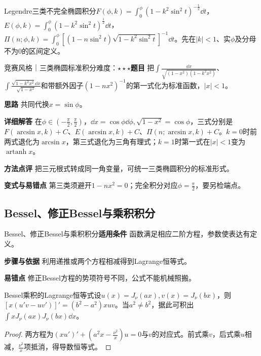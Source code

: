 \begin{definition}{Legendre三类不完全椭圆积分}$F(\phi,k)=\int_0^\phi(1-k^2\sin^2t)^{-\frac{1}{2}}\dd t$，$E(\phi,k)=\int_0^\phi(1-k^2\sin^2t)^{\frac{1}{2}}\dd t$，$\Pi(n;\phi,k)=\int_0^\phi[(1-n\sin^2t)\sqrt{1-k^2\sin^2t}]^{-1}\dd t$。先在$|k|<1$、实$\phi$及分母不为0的区间定义。\end{definition}

\begin{example}{竞赛风格｜三类椭圆标准积分}{难度：$\star\star\star$}\label{deep:ex:integral_special_deep:elliptic3}\textbf{题目} 把$\int\frac{\dd x}{\sqrt{(1-x^2)(1-k^2x^2)}}$、$\int\frac{\sqrt{1-k^2x^2}\dd x}{\sqrt{1-x^2}}$和带额外因子$(1-nx^2)^{-1}$的第一式化为标准函数，$|x|<1$。\par\textbf{思路} 共同代换$x=\sin\phi$。\par\textbf{详细解答} 在$\phi\in(-\frac{\pi}{2},\frac{\pi}{2})$，$\dd x=\cos\phi\dd\phi,\sqrt{1-x^2}=\cos\phi$，三式分别是$F(\arcsin x,k)+C$、$E(\arcsin x,k)+C$、$\Pi(n;\arcsin x,k)+C$。$k=0$时前两式退化为$\arcsin x$，第三式退化为三角有理式；$k=1$时第一式在$|x|<1$变为$\operatorname{artanh}x$。\par\textbf{方法点评} 把三元根式转成同一角变量，可统一三类椭圆积分的标准形式。\par\textbf{变式与易错点} 第三类须避开$1-nx^2=0$；完全积分对应$\phi=\frac{\pi}{2}$，要另检端点。\end{example}

\subsection{Bessel、修正Bessel与乘积积分}\label{deep:integral_special_deep:bessel}

\begin{method}{Bessel、修正Bessel与乘积积分}\textbf{适用条件} 函数满足相应二阶方程，参数使表达有定义。\par\textbf{步骤与依据} 利用递推或两个方程相减得到Lagrange恒等式。\par\textbf{易错点} 修正Bessel方程的势项符号不同，公式不能机械照搬。\end{method}

\begin{theorem}{Bessel乘积的Lagrange恒等式}设$u(x)=J_\nu(ax),v(x)=J_\nu(bx)$，则$[x(u'v-uv')]'=(b^2-a^2)xuv$。当$a^2\ne b^2$，据此可积出$\int xJ_\nu(ax)J_\nu(bx)\dd x$。\end{theorem}\begin{proof}两方程为$(xu')'+(a^2x-\frac{\nu^2}{x})u=0$与$v$的对应式。前式乘$v$，后式乘$u$相减，$\frac{\nu^2}{x}$项抵消，得导数恒等式。\end{proof}

